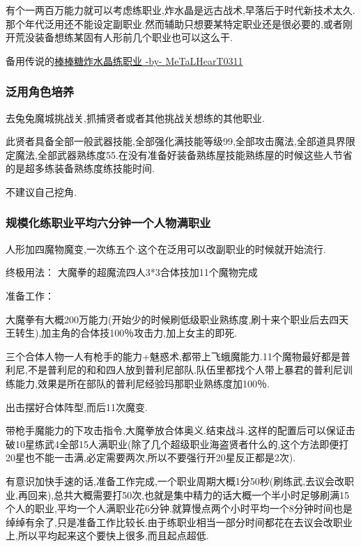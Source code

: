 	有个一两百万能力就可以考虑练职业,炸水晶是远古战术,早落后于时代新技术太久.那个年代泛用还不能设定副职业.然而辅助只想要某特定职业还是很必要的,或者刚开荒没装备想练某固有人形前几个职业也可以这么干.

	备用传说的\href{http://tieba.baidu.com/p/3717431968}{棒棒糖炸水晶练职业 -by- MeTaLHearT0311}

		\subsubsection{泛用角色培养}

		去兔兔魔城挑战关,抓捕贤者或者其他挑战关想练的其他职业.

		此贤者具备全部一般武器技能,全部强化满技能等级99,全部攻击魔法,全部道具界限定魔法,全部武器熟练度55.在没有准备好装备熟练屋技能熟练屋的时候这些人节省的是超多练装备熟练度练技能时间.

		不建议自己挖角.


		\subsubsection{规模化练职业平均六分钟一个人物满职业}

		人形加四魔物魔变,一次练五个.这个在泛用可以改副职业的时候就开始流行.

		终极用法：
		大魔拳的超魔流四人3*3合体技加11个魔物完成

		准备工作：

		大魔拳有大概200万能力(开始少的时候刷低级职业熟练度,刷十来个职业后去四天王转生),加主角的合体技100％攻击力,加上女主的即死.

		三个合体人物一人有枪手的能力+魅惑术,都带上飞蛾魔能力.11个魔物最好都是普利尼,不是普利尼的和和四人放到普利尼部队.队伍里都找个人带上暴君的普利尼训练能力,效果是所在部队的普利尼经验玛那职业熟练度加100％.

		出击摆好合体阵型,而后11次魔变.

		带枪手魔能力的下攻击指令,大魔拳放合体奥义.结束战斗.这样的配置后可以保证击破10星练武4全部15人满职业(除了几个超级职业海盗贤者什么的,这个方法即便打20星也不能一击满,必定需要两次,所以不要强行开20星反正都是2次).

		有意识加快手速的话,准备工作完成,一个职业周期大概1分50秒(刷练武,去议会改职业,再回来),总共大概需要打50次,也就是集中精力的话大概一个半小时足够刷满15个人的职业,平均一个人满职业花6分钟.就算慢点两个小时平均一个8分钟时间也是绰绰有余了,只是准备工作比较长.由于练职业相当一部分时间都花在去议会改职业上,所以平均起来这个要快上很多,而且起点超低.

